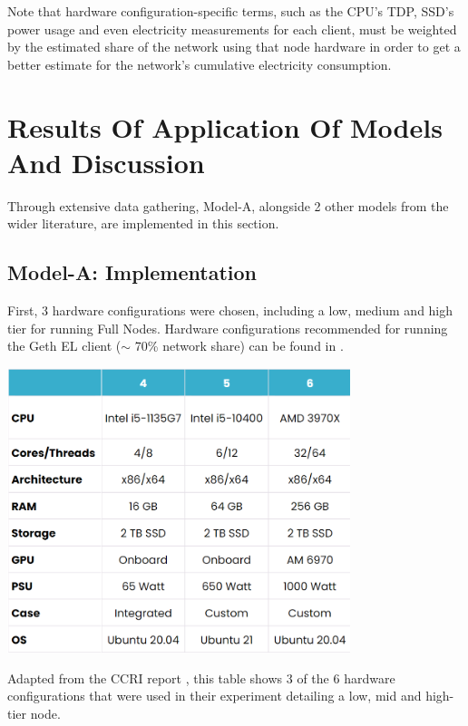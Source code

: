 Note that hardware configuration-specific terms, such as the CPU's TDP, SSD's power usage and even electricity measurements for each client, must be weighted by the estimated share of the network using that node hardware in order to get a better estimate for the network's cumulative electricity consumption. 


\section{Results Of Application Of Models And Discussion}
\label{ImplementationSection}
Through extensive data gathering, Model-A, alongside 2 other models from the wider literature, are implemented in this section.


\subsection{Model-A: Implementation}

First, 3 hardware configurations were chosen, including a low, medium and high tier for running Full Nodes. Hardware configurations recommended for running the Geth EL client ($\sim$ 70\% network share) can be found in .

\begin{table}[htb!]
    \centering
    \includegraphics[width=10cm,center]{Figures/CCRIhardwareConfigEdit.png}
    \caption{Adapted from the CCRI report \cite{CryptoCarbonRatingsInstitute2022TheNetwork}, this table shows 3 of the 6 hardware configurations that were used in their experiment detailing a low, mid and high-tier node.}
    \label{Table:CCRIhardwareConfig}
\end{table}

